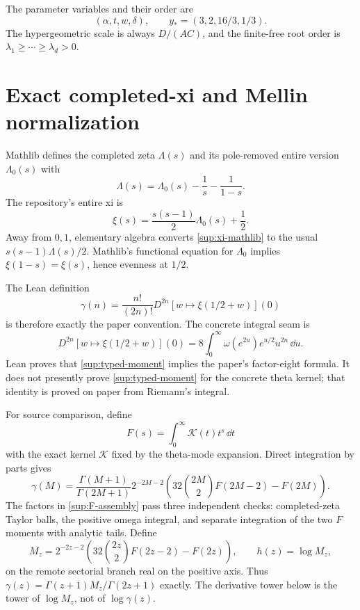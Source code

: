 \documentclass[10pt]{article}
\begin{document}
The parameter variables and their order are
\[
 (\alpha,t,w,\delta),\qquad
 y_*=(3,2,16/3,1/3).
\]
The hypergeometric scale is always $D/(AC)$, and the finite-free root order is
$\lambda_1\ge\cdots\ge\lambda_d>0$.

\section{Exact completed-xi and Mellin normalization}\label{sup:mellin}

Mathlib defines the completed zeta $\Lambda(s)$ and its pole-removed entire
version $\Lambda_0(s)$ with
\[
 \Lambda(s)=\Lambda_0(s)-\frac1s-\frac1{1-s}.
\]
The repository's entire xi is
\begin{equation}\label{sup:xi-mathlib}
 \xi(s)=\frac{s(s-1)}2\Lambda_0(s)+\frac12.
\end{equation}
Away from $0,1$, elementary algebra converts \eqref{sup:xi-mathlib} to the
usual $s(s-1)\Lambda(s)/2$.  Mathlib's functional equation for $\Lambda_0$
implies $\xi(1-s)=\xi(s)$, hence evenness at $1/2$.

The Lean definition
\[
 \gamma(n)=\frac{n!}{(2n)!}
 D^{2n}[w\mapsto\xi(1/2+w)](0)
\]
is therefore exactly the paper convention.  The concrete integral seam is
\begin{equation}\label{sup:typed-moment}
 D^{2n}[w\mapsto\xi(1/2+w)](0)
 =8\int_0^\infty\omega(e^{2u})e^{u/2}u^{2n}\,\dd u.
\end{equation}
Lean proves that \eqref{sup:typed-moment} implies the paper's factor-eight
formula.  It does not presently prove \eqref{sup:typed-moment} for the
concrete theta kernel; that identity is proved on paper from Riemann's
integral.

For source comparison, define
\[
 F(s)=\int_0^\infty \mathcal K(t)t^s\,\dd t
\]
with the exact kernel $\mathcal K$ fixed by the theta-mode expansion.  Direct
integration by parts gives
\begin{equation}\label{sup:F-assembly}
 \gamma(M)=\frac{\Gamma(M+1)}{\Gamma(2M+1)}2^{-2M-2}
 \left(32\binom{2M}{2}F(2M-2)-F(2M)\right).
\end{equation}
The factors in \eqref{sup:F-assembly} pass three independent checks:
completed-zeta Taylor balls, the positive omega integral, and separate
integration of the two $F$ moments with analytic tails.
Define
\[
 M_z=2^{-2z-2}\left(32\binom{2z}{2}F(2z-2)-F(2z)\right),
 \qquad h(z)=\log M_z,
\]
on the remote sectorial branch real on the positive axis.  Thus
$\gamma(z)=\Gamma(z+1)M_z/\Gamma(2z+1)$ exactly.  The derivative tower below
is the tower of $\log M_z$, not of $\log\gamma(z)$.
\end{document}
